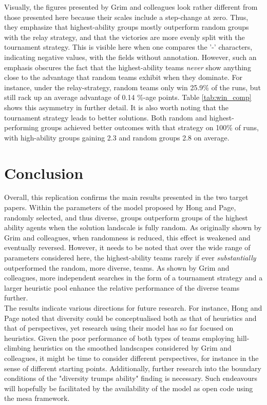  Visually, the figures presented by Grim and colleagues look rather different from those presented here because their scales include a step-change at zero. Thus, they emphasize that highest-ability groups mostly outperform random groups with the relay strategy, and that the victories are more evenly split with the tournament strategy. This is visible here when one compares the '-' characters, indicating negative values, with the fields without annotation. However, such an emphasis obscures the fact that the highest-ability teams \textit{never} show anything close to the advantage that random teams exhibit when they dominate. For instance, under the relay-strategy, random teams only win 25.9\% of the runs, but still rack up an average advantage of 0.14 \%-age points. Table \ref{tab:win_comp} shows this asymmetry in further detail. It is also worth noting that the tournament strategy leads to better solutions. Both random and highest-performing groups achieved better outcomes with that strategy on 100\% of runs, with high-ability groups gaining 2.3 and random groups 2.8 on average.
 

 \section{Conclusion}
 
 Overall, this replication confirms the main results presented in the two target papers. Within the parameters of the model proposed by Hong and Page, randomly selected, and thus diverse, groups outperform groups of the highest ability agents when the solution landscale is fully random. As originally shown by Grim and colleagues, when randomness is reduced, this effect is weakened and eventually reversed. However, it needs to be noted that over the wide range of parameters considered here, the highest-ability teams rarely if ever \textit{substantially} outperformed the random, more diverse, teams. As shown by Grim and colleagues, more independent searches in the form of a tournament strategy and a larger heuristic pool enhance the relative performance of the diverse teams further. \\

 The results indicate various directions for future research. For instance, Hong and Page noted that diversity could be conceptualised both as that of heuristics and that of perspectives, yet research using their model has so far focused on heuristics. Given the poor performance of both types of teams employing hill-climbing heuristics on the smoothed landscapes considered by Grim and colleagues, it might be time to consider different perspectives, for instance in the sense of different starting points. Additionally, further research into the boundary conditions of the "diversity trumps ability" finding is necessary. Such endeavours will hopefully be facilitated by the availability of the model as open code using the mesa framework. 